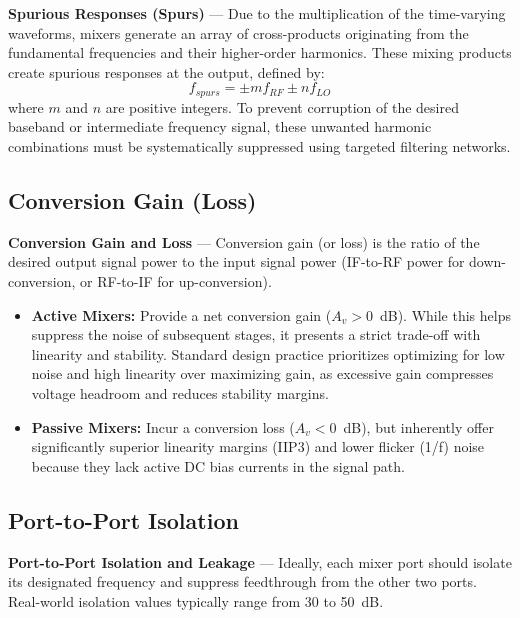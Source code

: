 \textbf{Spurious Responses (Spurs)} --- Due to the multiplication of the time-varying waveforms, mixers generate an array of cross-products originating from the fundamental frequencies and their higher-order harmonics. These mixing products create spurious responses at the output, defined by:
\begin{equation}
f_{spurs} = \pm m f_{RF} \pm n f_{LO}
\end{equation}
where $m$ and $n$ are positive integers. To prevent corruption of the desired baseband or intermediate frequency signal, these unwanted harmonic combinations must be systematically suppressed using targeted filtering networks.

\subsection{Conversion Gain (Loss)}

\textbf{Conversion Gain and Loss} --- Conversion gain (or loss) is the ratio of the desired output signal power to the input signal power (IF-to-RF power for down-conversion, or RF-to-IF for up-conversion).

\begin{itemize}
    \item \textbf{Active Mixers:} Provide a net conversion gain ($A_v > 0$~dB). While this helps suppress the noise of subsequent stages, it presents a strict trade-off with linearity and stability. Standard design practice prioritizes optimizing for low noise and high linearity over maximizing gain, as excessive gain compresses voltage headroom and reduces stability margins.
    \item \textbf{Passive Mixers:} Incur a conversion loss ($A_v < 0$~dB), but inherently offer significantly superior linearity margins (IIP3) and lower flicker (1/f) noise because they lack active DC bias currents in the signal path.
\end{itemize}

\subsection{Port-to-Port Isolation}

\textbf{Port-to-Port Isolation and Leakage} --- Ideally, each mixer port should isolate its designated frequency and suppress feedthrough from the other two ports. Real-world isolation values typically range from 30 to 50~dB.


